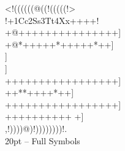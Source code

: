\documentclass[10pt]{article}
\begin{document}
\begin{center}
{
{
\gnos%
<!((((((@((!(((((!>\\
!+1Cc2Ss3Tt4Xx++++!\\
+@+++++++++++++++]\\
+@*+++++*+++++*++]\\}
{\gnosb{}}{\gnos]\\}
{\gnosw{}}{\gnos]\\
+++++++++++++++++]\\
++*{\gnoswi{}}{\gnoswii{}}{\gnoswiii{}}{\gnosbi{}}{\gnosbii{}}{\gnosbiii{}}*++++*++]\\
+++++++++++++++++]\\
++++++++++%
%
+]\\
,!))))@)!))))))))!.\\
}}
20pt -- Full Symbols
\end{center}

\newpage
\end{document}

